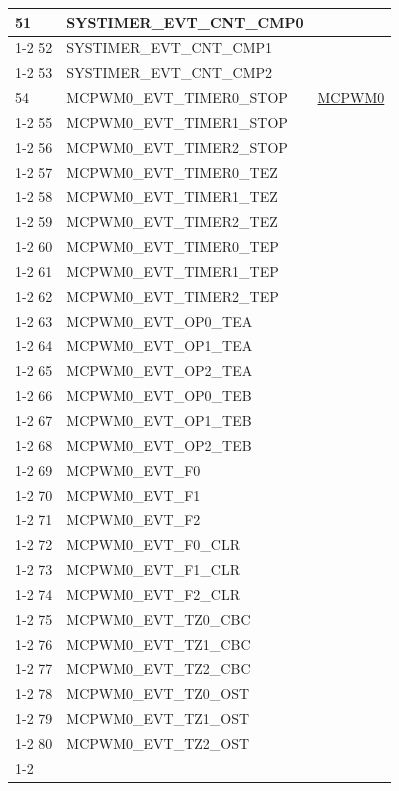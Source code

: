 \documentclass[main\_\_EN.tex]{subfiles}
\begin{document}
\begin{longtable}{ | l | l | l | }
51  & SYSTIMER\_EVT\_CNT\_CMP0  & \nameref{mod:systimer}     \\ \cline{1-2}
52  & SYSTIMER\_EVT\_CNT\_CMP1  & \\ \cline{1-2}
53  & SYSTIMER\_EVT\_CNT\_CMP2  & \\ \hline
54  & MCPWM0\_EVT\_TIMER0\_STOP  & \hyperref[mod:mcpwm]{MCPWM0}\\ \cline{1-2}
55  & MCPWM0\_EVT\_TIMER1\_STOP  & \\ \cline{1-2}
56  & MCPWM0\_EVT\_TIMER2\_STOP  & \\ \cline{1-2}
57  & MCPWM0\_EVT\_TIMER0\_TEZ   & \\ \cline{1-2}
58  & MCPWM0\_EVT\_TIMER1\_TEZ   & \\ \cline{1-2}
59  & MCPWM0\_EVT\_TIMER2\_TEZ   & \\ \cline{1-2}
60  & MCPWM0\_EVT\_TIMER0\_TEP   & \\ \cline{1-2}
61  & MCPWM0\_EVT\_TIMER1\_TEP   & \\ \cline{1-2}
62  & MCPWM0\_EVT\_TIMER2\_TEP   & \\ \cline{1-2}
63  & MCPWM0\_EVT\_OP0\_TEA & \\ \cline{1-2}
64  & MCPWM0\_EVT\_OP1\_TEA & \\ \cline{1-2}
65  & MCPWM0\_EVT\_OP2\_TEA & \\ \cline{1-2}
66  & MCPWM0\_EVT\_OP0\_TEB & \\ \cline{1-2}
67  & MCPWM0\_EVT\_OP1\_TEB & \\ \cline{1-2}
68  & MCPWM0\_EVT\_OP2\_TEB & \\ \cline{1-2}
69  & MCPWM0\_EVT\_F0     & \\ \cline{1-2}
70  & MCPWM0\_EVT\_F1     & \\ \cline{1-2}
71  & MCPWM0\_EVT\_F2     & \\ \cline{1-2}
72  & MCPWM0\_EVT\_F0\_CLR  & \\ \cline{1-2}
73  & MCPWM0\_EVT\_F1\_CLR  & \\ \cline{1-2}
74  & MCPWM0\_EVT\_F2\_CLR  & \\ \cline{1-2}
75  & MCPWM0\_EVT\_TZ0\_CBC & \\ \cline{1-2}
76  & MCPWM0\_EVT\_TZ1\_CBC & \\ \cline{1-2}
77  & MCPWM0\_EVT\_TZ2\_CBC & \\ \cline{1-2}
78  & MCPWM0\_EVT\_TZ0\_OST & \\ \cline{1-2}
79  & MCPWM0\_EVT\_TZ1\_OST & \\ \cline{1-2}
80  & MCPWM0\_EVT\_TZ2\_OST & \\ \cline{1-2}

\end{longtable}
\end{document}

